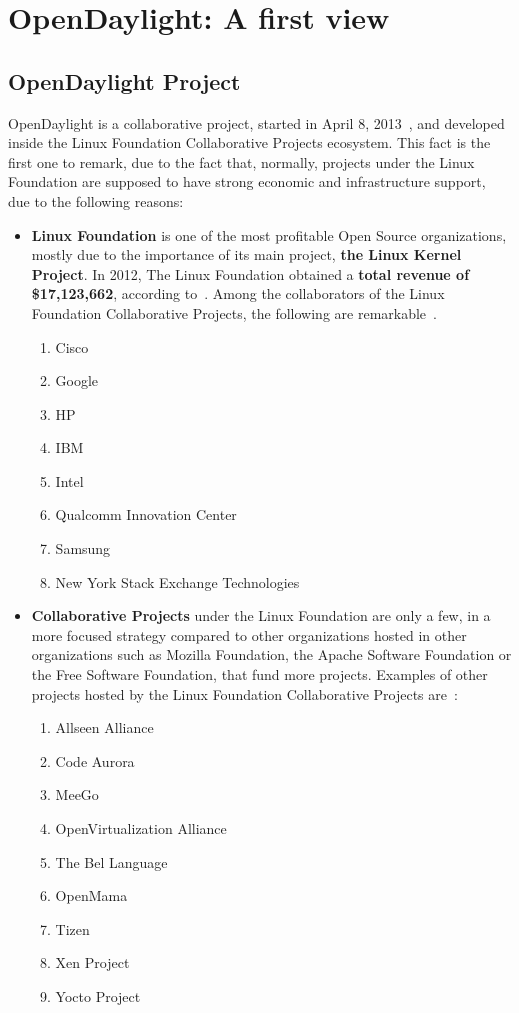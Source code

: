 \documentclass[a4paper, 12pt]{book}
\begin{document}
\chapter{OpenDaylight: A first view}
\label{chap:odlfirstview}

\section{OpenDaylight Project}
\label{sec:odlintro}

OpenDaylight is a collaborative project, started in April 8, 2013~\cite{OpenDaylightAnnouncement}, and developed inside the Linux Foundation Collaborative Projects ecosystem. This fact is the first one to remark, due to the fact that, normally, projects under the Linux Foundation are supposed to have strong economic and infrastructure support, due to the following reasons:
\begin{itemize}
 \item \textbf{Linux Foundation} is one of the most profitable Open Source organizations, mostly due to the importance of its main project, \textbf{the Linux Kernel Project}. In 2012, The Linux Foundation obtained a \textbf{total revenue of \$17,123,662}, according to~\cite{2012LinuxFoundationReport}. Among the collaborators of the Linux Foundation Collaborative Projects, the following are remarkable~\cite{LinuxFoundationCollaborativeProjects}.
 \begin{enumerate}\itemsep0pt
  \item Cisco
  \item Google
  \item HP
  \item IBM
  \item Intel
  \item Qualcomm Innovation Center
  \item Samsung
  \item New York Stack Exchange Technologies
 \end{enumerate}
 \item \textbf{Collaborative Projects} under the Linux Foundation are only a few, in a more focused strategy compared to other organizations hosted in other organizations such as Mozilla Foundation, the Apache Software Foundation or the Free Software Foundation, that fund more projects. Examples of other projects hosted by the Linux Foundation Collaborative Projects are~\cite{LinuxFoundationCollaborativeProjects}:
 \begin{enumerate}\itemsep0pt
  \item Allseen Alliance
  \item Code Aurora
  \item MeeGo
  \item OpenVirtualization Alliance
  \item The Bel Language
  \item OpenMama
  \item Tizen
  \item Xen Project
  \item Yocto Project
 \end{enumerate}
\end{itemize}
\end{document}
